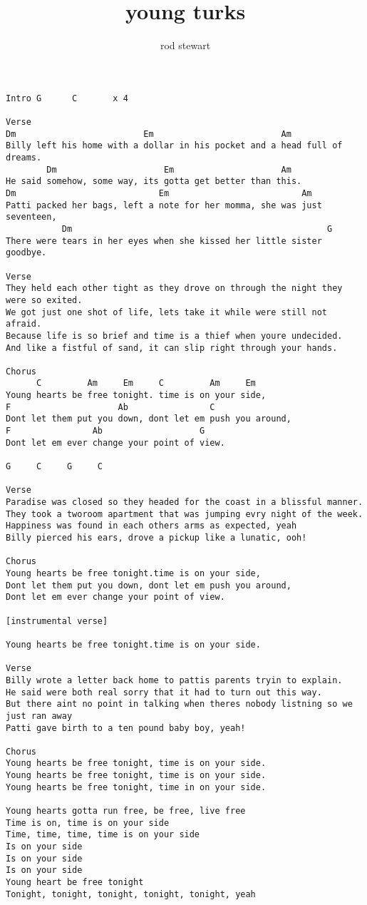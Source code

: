 \author{rod stewart}
\title{young turks}
\maketitle
\begin{verbatim}
Intro G      C       x 4

Verse
Dm                         Em                         Am
Billy left his home with a dollar in his pocket and a head full of dreams.
        Dm                     Em                     Am
He said somehow, some way, its gotta get better than this.
Dm                            Em                          Am
Patti packed her bags, left a note for her momma, she was just seventeen,
           Dm                                                  G
There were tears in her eyes when she kissed her little sister goodbye.

Verse
They held each other tight as they drove on through the night they were so exited.
We got just one shot of life, lets take it while were still not afraid.
Because life is so brief and time is a thief when youre undecided.
And like a fistful of sand, it can slip right through your hands.

Chorus
      C         Am     Em     C         Am     Em
Young hearts be free tonight. time is on your side,
F                     Ab                C
Dont let them put you down, dont let em push you around,
F                Ab                   G
Dont let em ever change your point of view.

G     C     G     C

Verse
Paradise was closed so they headed for the coast in a blissful manner.
They took a tworoom apartment that was jumping evry night of the week.
Happiness was found in each others arms as expected, yeah
Billy pierced his ears, drove a pickup like a lunatic, ooh!

Chorus
Young hearts be free tonight.time is on your side,
Dont let them put you down, dont let em push you around,
Dont let em ever change your point of view.

[instrumental verse]

Young hearts be free tonight.time is on your side.

Verse
Billy wrote a letter back home to pattis parents tryin to explain.
He said were both real sorry that it had to turn out this way.
But there aint no point in talking when theres nobody listning so we just ran away
Patti gave birth to a ten pound baby boy, yeah!

Chorus
Young hearts be free tonight, time is on your side.
Young hearts be free tonight, time is on your side.
Young hearts be free tonight, time in on your side.

Young hearts gotta run free, be free, live free
Time is on, time is on your side
Time, time, time, time is on your side
Is on your side
Is on your side
Is on your side
Young heart be free tonight
Tonight, tonight, tonight, tonight, tonight, yeah
\end{verbatim}